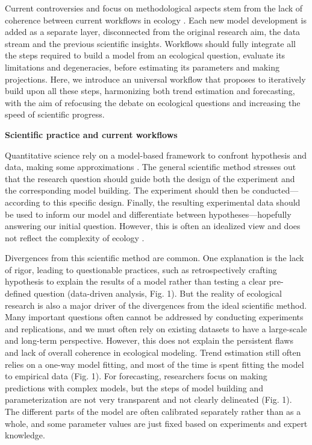 \documentclass[11pt]{article}
\begin{document}
Current controversies and focus on methodological aspects stem from the lack of coherence between current workflows in ecology \citep{Loreau2022, Talis2023, Johnson2024}. Each new model development is added as a separate layer, disconnected from the original research aim, the data stream and the previous scientific insights. Workflows should fully integrate all the steps required to build a model from an ecological question, evaluate its limitations and degeneracies, before estimating its parameters and making projections. Here, we introduce an universal workflow that proposes to iteratively build upon all these steps, harmonizing both trend estimation and forecasting, with the aim of refocusing the debate on ecological questions and increasing the speed of scientific progress.

\vspace{0.2cm}
\noindent \textbf{Scientific practice and current workflows}

Quantitative science rely on a model-based framework to confront hypothesis and data, making some approximations \citep{}. The general scientific method stresses out that the research question should guide both the design of the experiment and the corresponding model building. The experiment should then be conducted---according to this specific design. Finally, the resulting experimental data should be used to inform our model and differentiate between hypotheses---hopefully answering our initial question. However, this is often an idealized view and does not reflect the complexity of ecology \citep{}.

Divergences from this scientific method are common. One explanation is the lack of rigor, leading to questionable practices, such as retrospectively crafting hypothesis to explain the results of a model rather than testing a clear pre-defined question (data-driven analysis, Fig. 1). But the reality of ecological research is also a major driver of the divergences from the ideal scientific method. Many important questions often cannot be addressed by conducting experiments and replications, and we must often rely on existing datasets to have a large-scale and long-term perspective. However, this does not explain the persistent flaws and lack of overall coherence in ecological modeling. Trend estimation still often relies on a one-way model fitting, and most of the time is spent fitting the model to empirical data (Fig. 1). For forecasting, researchers focus on making predictions with complex models, but the steps of model building and parameterization are not very transparent and not clearly delineated (Fig. 1). The different parts of the model are often calibrated separately rather than as a whole, and some parameter values are just fixed based on experiments and expert knowledge.
\end{document}
